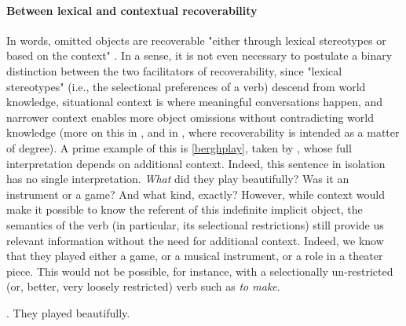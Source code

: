 \paragraph{Between lexical and contextual recoverability}

In  words, omitted objects are recoverable "either through lexical stereotypes or based on the context" \parencite[7]{Kardos2010}. In a sense, it is not even necessary to postulate a binary distinction between the two facilitators of recoverability, since "lexical stereotypes" (i.e., the selectional preferences of a verb) descend from world knowledge, situational context is where meaningful conversations happen, and narrower context enables more object omissions without contradicting world knowledge (more on this in , and in \textcite{Glass2013, Glass2020, glass2022english}, where recoverability is intended as a matter of degree). A prime example of this is \ref{berghplay}, taken by \textcite[24]{BerghOhlander2016}, whose full interpretation depends on additional context. Indeed, this sentence in isolation has no single interpretation. \textit{What} did they play beautifully? Was it an instrument or a game? And what kind, exactly? However, while context would make it possible to know the referent of this indefinite implicit object, the semantics of the verb (in particular, its selectional restrictions) still provide us relevant information without the need for additional context. Indeed, we know that they played either a game, or a musical instrument, or a role in a theater piece. This would not be possible, for instance, with a selectionally un-restricted (or, better, very loosely restricted) verb such as \textit{to make}.

\ex. \label{berghplay} They played beautifully.

